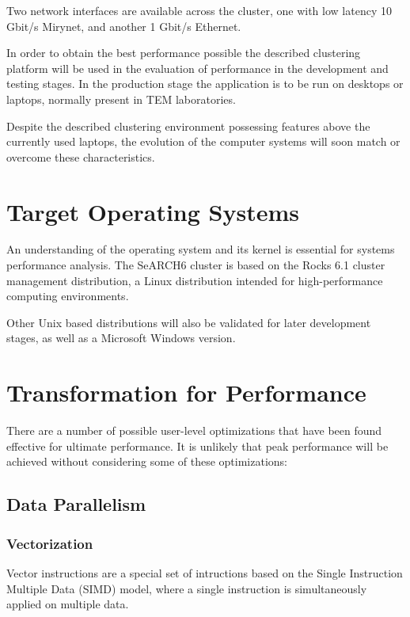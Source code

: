 \documentclass[
  oneside,
  11pt, a4paper,
  footinclude=true,
  headinclude=true,
  cleardoublepage=empty
]{scrbook}
\begin{document}
Two network interfaces are available across the cluster, one with low latency 10 Gbit/s Mirynet, and another 1 Gbit/s Ethernet.\par 

In order to obtain the best performance possible the described clustering platform will be used in the evaluation of performance in the  development and testing stages. In the production stage the application is to be run on desktops or laptops, normally present in TEM laboratories.\par 
Despite the described clustering environment possessing features above the currently used laptops, the evolution of the computer systems will soon match or overcome these characteristics.

\section{Target Operating Systems}
An understanding of the operating system and its kernel is essential for systems
performance analysis. The SeARCH6 cluster is based on the Rocks 6.1 cluster management distribution, a Linux distribution intended for high-performance computing environments.\par 

Other Unix based distributions will also be validated for later development stages, as well as a Microsoft Windows version.

\section{Transformation for Performance}


There are a number of possible user-level optimizations that have been found effective for ultimate performance. It is unlikely that peak performance will be achieved without considering some of these optimizations:

\subsection{Data Parallelism}

\subsubsection{Vectorization}

Vector instructions are a special set of intructions based on the Single Instruction Multiple Data (SIMD) model, where a single instruction is simultaneously applied on multiple data.\par 
\end{document}
